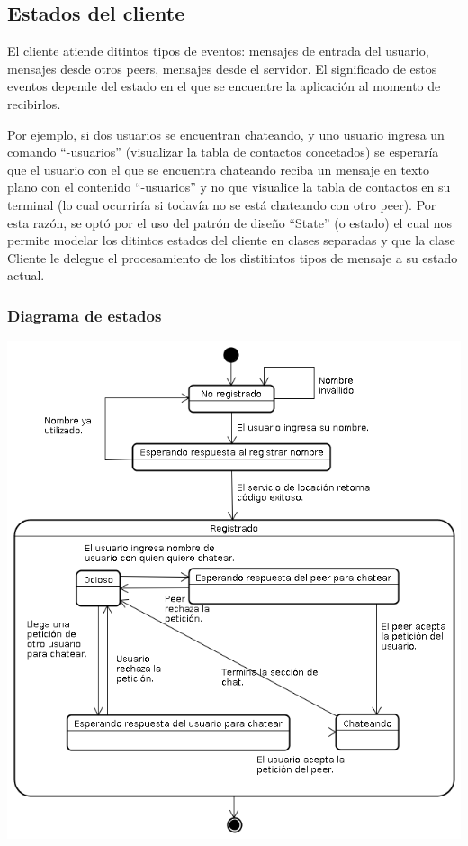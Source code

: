 \subsection{Estados del cliente}

El cliente atiende ditintos tipos de eventos: mensajes de entrada del usuario, mensajes desde otros peers, mensajes desde el servidor. El significado de estos eventos depende del estado en el que se encuentre la aplicación al momento de recibirlos. 

Por ejemplo, si dos usuarios se encuentran chateando, y uno usuario ingresa un comando 
``-usuarios'' (visualizar la tabla de contactos concetados) se esperaría que el usuario con el que se encuentra
chateando reciba un mensaje en texto plano con el contenido ``-usuarios'' y no que visualice la
tabla de contactos en su terminal (lo cual ocurriría si todavía no se está chateando con otro peer). Por esta razón, se optó por el uso del patrón de diseño ``State'' (o estado) el cual nos permite modelar los ditintos estados del cliente en clases separadas y que la clase Cliente le delegue el procesamiento de los distitintos tipos de mensaje a su estado actual.  

\subsubsection{Diagrama de estados}
\begin{center}
\small\includegraphics[scale=0.65]{./Images/DiagramaDeEstados}
\end{center}

